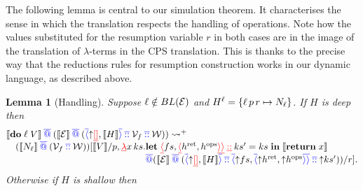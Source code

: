 \documentclass[12pt,phd,lfcs,twoside,openright,logo,leftchapter,normalheadings]{infthesis}
\theoremstyle{plain}
\newtheorem{lemma}[theorem]{Lemma}
\theoremstyle{definition}
\begin{document}
The following lemma is central to our simulation theorem. It
characterises the sense in which the translation respects the handling
of operations.  Note how the values substituted for the resumption
variable $r$ in both cases are in the image of the translation of
$\lambda$-terms in the CPS translation. This is thanks to the precise
way that the reductions rules for resumption construction works in our
dynamic language, as described above.
%
\begin{lemma}[Handling]\label{lem:handle-op-gen-cont}
Suppose $\ell \notin BL(\mathcal{E})$ and $H^{\ell} = \{\ell\,p\,r \mapsto N_\ell\}$. If $H$ is deep then
  \[
    \bl
    \cps{\Do\;\ell\;V} \sapp (\cps{\EC} \sapp (\sRecord{\snil, \cps{H}} \scons \sV_f \scons \sW)) \reducesto^+ \\
    \quad (\cps{N_\ell} \sapp (\sV_f \scons \sW))
    [\cps{V}/p,
    \dlam x\,\dhk.\bl
    \Let\;\dRecord{fs, \dRecord{\vhret, \vhops}} \dcons \dhk' = \dhk\;\In\;
    \cps{\Return\;x}\\
    \sapp (\cps{\EC} \sapp (\sRecord{\snil, \cps{H}} \scons \sRecord{\reflect \dlk, \sRecord{\reflect \vhret, \reflect \vhops}} \scons \reflect\dhk'))/r]. \\
    \el\\
    \el
  \]
  Otherwise if $H$ is shallow then

\end{lemma}
\end{document}

